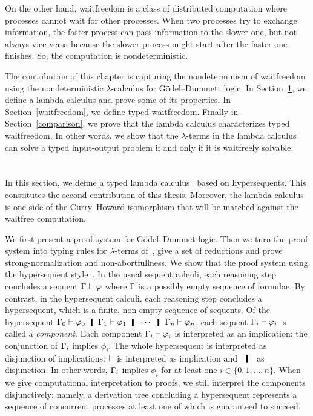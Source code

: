 On the other hand, waitfreedom is a class of distributed computation
where processes cannot wait for other processes.  When two processes try
to exchange information, the faster process can pass information to the
slower one, but not always vice versa because the slower process might
start after the faster one finishes.
So, the computation is nondeterministic.

The contribution of this chapter is capturing
the nondeterminism of waitfreedom using the nondeterministic
$\lambda$-calculus for G\"odel--Dummett logic.
In Section~\ref{lgd},
we define a lambda calculus and prove some of its properties.
In Section~\ref{waitfreedom}, we define typed waitfreedom.
Finally in Section~\ref{comparison},
we prove that the lambda calculus characterizes typed waitfreedom.
In other words, we show that the
$\lambda$-terms in the lambda calculus can solve a typed input-output
problem if and only if it is waitfreely solvable.

\section{\lgd}
\label{lgd}

In this section, we define a typed lambda calculus \lgd\, based on
hypersequents.
This constitutes the second contribution of this thesis.
Moreover, the lambda calculus is one side of the Curry--Howard
isomorphism that will be matched against the waitfree computation.

We first present a proof system for G\"odel--Dummet logic.
Then we turn the proof system into typing rules for $\lambda$-terms
of~\lgd, give a set of reductions and prove strong-normalization and
non-abortfullness.
We show that the proof system using the hypersequent
style~\citep{avron91}.
In the usual sequent calculi, each reasoning step concludes a sequent
$\Gamma\vdash\varphi$ where $\Gamma$ is a possibly empty sequence of formulae.
By contrast,
in the hypersequent calculi, each reasoning step concludes a
hypersequent, which is a finite, non-empty sequence of sequents.
Of the hypersequent
$\G_0\vdash\phi_0\hmid\G_1\vdash\phi_1\hmid\cdots\hmid\G_n\vdash\phi_n$,
each sequent $\Gamma_i\vdash\varphi_i$ is called a
\textit{component}.
Each component $\Gamma_i\vdash\varphi_i$ is interpreted as an implication: the
conjunction of $\Gamma_i$ implies $\phi_i$.
The whole hypersequent is interpreted as disjunction of implications:
$\vdash$ is interpreted as implication and $\hmid$ as
disjunction.
In other words, $\Gamma_i$ implies $\phi_i$ for at least one $i\in
\{0,1,\ldots,n\}$.
When we give computational interpretation to proofs, we still interpret
the components
disjunctively: namely, a derivation tree concluding a hypersequent
represents a sequence of concurrent processes at least one of which is
guaranteed to succeed.

